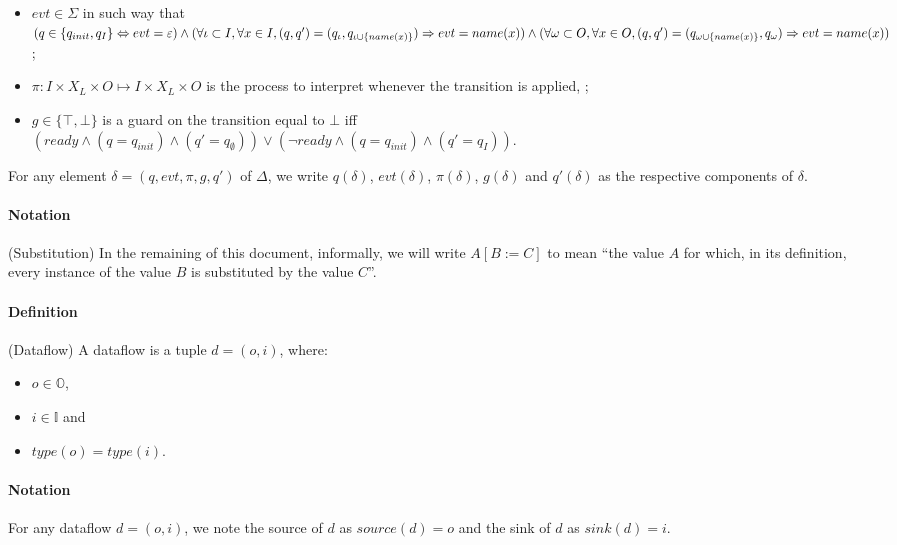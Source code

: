 \documentclass{article}
\begin{document}
\begin{itemize}
\begin{itemize}
        \item $evt \in \Sigma$ in such way that\\$(q\in \{q_{init},q_{I}\} \Leftrightarrow evt = \varepsilon)\\
        \wedge(\forall \iota \subset I, \forall x \in I, (q, q') = (q_{\iota},q_{\iota\cup\{name(x)\}}) \Rightarrow evt = name(x))\\
        \wedge(\forall \omega \subset O, \forall x \in O, (q, q') = (q_{\omega\cup\{name(x)\}},q_{\omega}) \Rightarrow evt = name(x))$; 
        \item $\pi : I \times X_L \times O \mapsto I \times X_L \times O$ is the process to interpret whenever the transition is applied, ;
        \item $g \in \{\top,\bot\}$ is a guard on the transition equal to $\bot$ iff\\$(ready \wedge (q = q_{init}) \wedge (q' = q_\emptyset)) \vee (\neg ready \wedge (q = q_{init}) \wedge (q' = q_I))$.
    \end{itemize}
\end{itemize}

For any element $\delta = (q, evt, \pi, g, q')$ of $\Delta$, we write $q(\delta)$, $evt(\delta)$, $\pi(\delta)$, $g(\delta)$ and $q'(\delta)$ as the respective components of $\delta$.

\paragraph{Notation} (Substitution) In the remaining of this document, informally, we will write $A[B := C]$ to mean ``the value $A$ for which, in its definition, every instance of the value $B$ is substituted by the value $C$''.

\paragraph{Definition} (Dataflow) A dataflow is a tuple $d=(o,i)$, where:
\begin{itemize}
    \item $o\in\mathbb{O}$,
    \item $i\in\mathbb{I}$ and
    \item $type(o)=type(i)$.
\end{itemize}

\paragraph{Notation} For any dataflow $d = (o,i)$, we note the source of $d$ as $source(d) = o$ and the sink of $d$ as $sink(d) = i$.
\end{document}
